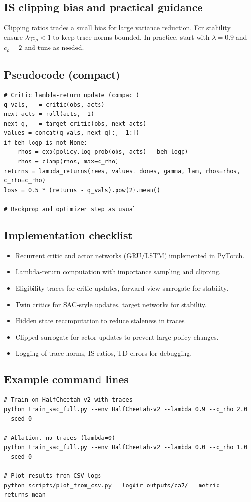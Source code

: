 \documentclass{article}
\begin{document}
\subsection{IS clipping bias and practical guidance}
Clipping ratios trades a small bias for large variance reduction. For stability ensure
\(\lambda\gamma c_\rho < 1\) to keep trace norms bounded. In practice, start with
\(\lambda=0.9\) and \(c_\rho=2\) and tune as needed.

\subsection{Pseudocode (compact)}
\begin{verbatim}
# Critic lambda-return update (compact)
q_vals, _ = critic(obs, acts)
next_acts = roll(acts, -1)
next_q, _ = target_critic(obs, next_acts)
values = concat(q_vals, next_q[:, -1:])
if beh_logp is not None:
    rhos = exp(policy.log_prob(obs, acts) - beh_logp)
    rhos = clamp(rhos, max=c_rho)
returns = lambda_returns(rews, values, dones, gamma, lam, rhos=rhos, c_rho=c_rho)
loss = 0.5 * (returns - q_vals).pow(2).mean()

# Backprop and optimizer step as usual

\end{verbatim}

\subsection{Implementation checklist}
\begin{itemize}
  \item Recurrent critic and actor networks (GRU/LSTM) implemented in PyTorch.
  \item Lambda-return computation with importance sampling and clipping.
  \item Eligibility traces for critic updates, forward-view surrogate for stability.
  \item Twin critics for SAC-style updates, target networks for stability.
  \item Hidden state recomputation to reduce staleness in traces.
  \item Clipped surrogate for actor updates to prevent large policy changes.
  \item Logging of trace norms, IS ratios, TD errors for debugging.
\end{itemize}

\subsection{Example command lines}
\begin{verbatim}
# Train on HalfCheetah-v2 with traces
python train_sac_full.py --env HalfCheetah-v2 --lambda 0.9 --c_rho 2.0 --seed 0

# Ablation: no traces (lambda=0)
python train_sac_full.py --env HalfCheetah-v2 --lambda 0.0 --c_rho 1.0 --seed 0

# Plot results from CSV logs
python scripts/plot_from_csv.py --logdir outputs/ca7/ --metric returns_mean
\end{verbatim}
\end{document}
